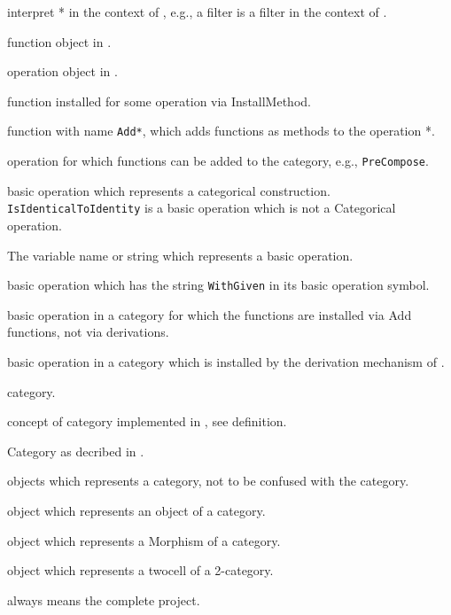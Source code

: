 
\begin{itemize}
 
 \itembold{\GAP *} interpret * in the context of \GAP, e.g., a \GAP filter is
   a filter in the context of \GAP.
 
  function object in \GAP.
 
  operation object in \GAP.
 
  function installed for some operation via InstallMethod.
 
  function with name \texttt{Add*}, which adds functions as methods
   to the operation *.
 
  operation for which functions can be added to the category, e.g., \texttt{PreCompose}.
 
  basic operation which represents a categorical construction. \texttt{IsIdenticalToIdentity}
   is a basic operation which is not a Categorical operation.
 
  The variable name or string which represents a basic operation.
 
  basic operation which has the string \texttt{WithGiven} in its basic operation symbol.
 
  basic operation in a category for which the functions are installed via Add functions, not via
   derivations.
 
  basic operation in a category which is installed by the derivation mechanism of \CapPkg.
 
  \CapPkg category.
 
  concept of category implemented in \CapPkg, see definition.
 
  Category as decribed in \cite{MLCWM}.
 
  \GAP objects which represents a \CapPkg category, not to be confused with the \GAP category.
 
  \GAP object which represents an object of a category.
 
  \GAP object which represents a Morphism of a category.
 
  \GAP object which represents a twocell of a 2-category.
 
 \itembold{\CapPkg} always means the complete \CapPkg project.
 
\end{itemize}

